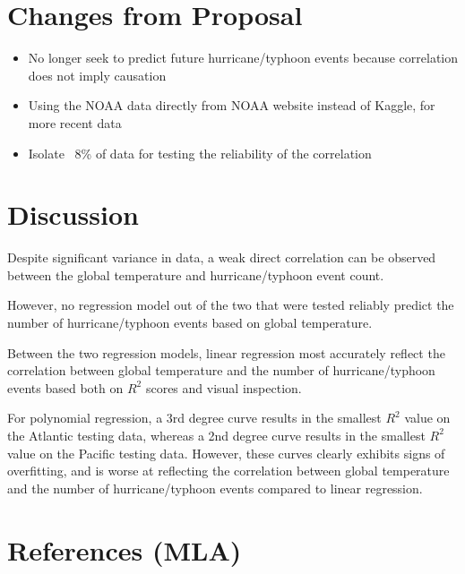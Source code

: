\documentclass[fontsize=11pt]{article}
\begin{document}
\section*{Changes from Proposal}
\begin{itemize}
    \item No longer seek to predict future hurricane/typhoon events because correlation does not imply causation

    \item Using the NOAA data directly from NOAA website instead of Kaggle, for more recent data

    \item Isolate ~8\% of data for testing the reliability of the correlation
\end{itemize}

\section*{Discussion}

Despite significant variance in data, a weak direct correlation can be observed between the global temperature and hurricane/typhoon event count.

However, no regression model out of the two that were tested reliably predict the number of hurricane/typhoon events based on global temperature.

Between the two regression models, linear regression most accurately reflect the correlation between global temperature and the number of hurricane/typhoon events based both on $R^2$ scores and visual inspection.

For polynomial regression, a 3rd degree curve results in the smallest $R^2$ value on the Atlantic testing data, whereas a 2nd degree curve results in the smallest $R^2$ value on the Pacific testing data.
However, these curves clearly exhibits signs of overfitting, and is worse at reflecting the correlation between global temperature and the number of hurricane/typhoon events compared to linear regression.


\section*{References (MLA)}
\end{document}
